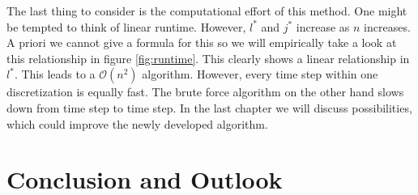 \documentclass[12pt,a4paper,twoside, open=right]{scrreprt}
\theoremstyle{definition}
\theoremstyle{plain}
\begin{document}
The last thing to consider is the computational effort of this method. One might be tempted to think of linear runtime. However, $l^*$ and $j^*$ increase as $n$ increases. A priori we cannot give a formula for this so we will empirically take a look at this relationship in figure \ref{fig:runtime}. This clearly shows a linear relationship in $l^*$. This leads to a $\mathcal{O}(n^2)$ algorithm. However, every time step within one discretization is equally fast. The brute force algorithm on the other hand slows down from time step to time step. In the last chapter we will discuss possibilities, which could improve the newly developed algorithm.

\chapter{Conclusion and Outlook}
\end{document}

